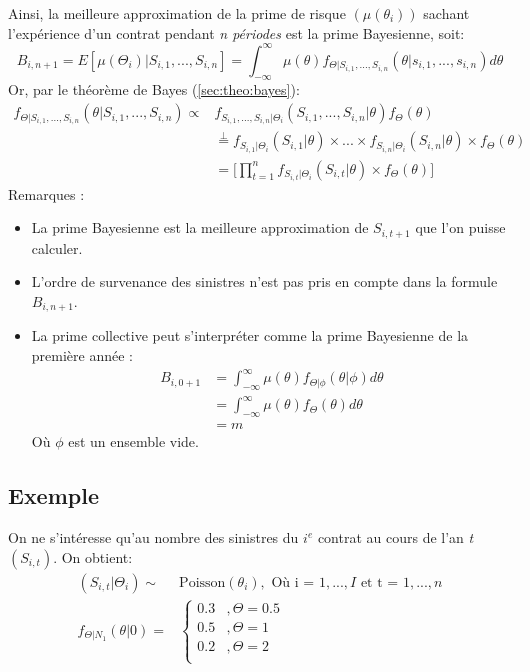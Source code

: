 Ainsi, la meilleure approximation de la prime de risque $(\mu(\theta_i))$ sachant l'expérience d'un contrat pendant \emph{n périodes} est la prime Bayesienne, soit:
\begin{equation}
\label{eq:prime bayesienne}
B_{i,n+1} = E[\mu(\Theta_i)|S_{i,1}, ..., S_{i,n}] = \int_{-\infty}^{\infty} \mu(\theta) f_{\Theta|S_{i,1}, ..., S_{i,n}}(\theta| s_{i,1}, ..., s_{i,n})d\theta
\end{equation}
Or, par le théorème de Bayes (\ref{sec:theo:bayes}):
\begin{align*}
f_{\Theta|S_{i,1}, ..., S_{i,n}}(\theta|S_{i,1}, ..., S_{i,n}) \propto & f_{S_{i,1}, ..., S_{i,n}|\Theta_i}(S_{i,1}, ..., S_{i,n}|\theta) f_{\Theta}(\theta)\\
& \overset{\perp}{=} f_{S_{i,1}|\Theta_i}(S_{i,1}|\theta)\times ...\times  f_{S_{i,n}|\Theta_i}(S_{i,n}|\theta) \times  f_{\Theta}(\theta)\\
& = \Bigg[ \prod_{t =1}^{n} f_{S_{i,t}|\Theta_i}(S_{i,t}|\theta)\times  f_{\Theta}(\theta) \Bigg]
\end{align*}
Remarques :
\begin{itemize}
\item La prime Bayesienne est la meilleure approximation de $S_{i,t+1}$ que l'on puisse calculer.
\item L'ordre de survenance des sinistres n'est pas pris en compte dans la formule $B_{i,n+1}$.
\item La prime collective peut s'interpréter comme la prime Bayesienne de la première année :
	\begin{align*}
	B_{i,0+1} &=  \int_{-\infty}^{\infty} \mu(\theta) f_{\Theta|\phi}(\theta| \phi)d\theta \\
	&= \int_{-\infty}^{\infty} \mu(\theta) f_{\Theta}(\theta)d\theta \\
	&= m
	\end{align*}
	Où $\phi$ est un ensemble vide.
\end{itemize}
\subsection*{Exemple}
On ne s'intéresse qu'au nombre des sinistres du $i^{e}$ contrat au cours de l'an \emph{t} $(S_{i,t})$.
On obtient:
\begin{align*}
(S_{i,t}|\Theta_i) \sim &\text{Poisson}(\theta_i),  \text{ Où i = }1, ..., I \text{ et } \text{t = } 1,...,n \\
f_{\Theta|N_1}(\theta|0) = & \left\{
     \begin{array}{rl}
      0.3 &, \Theta = 0.5 \\
      0.5 &, \Theta = 1 \\
      0.2 &, \Theta = 2 \\
     \end{array}
     \right. \\
\end{align*}
